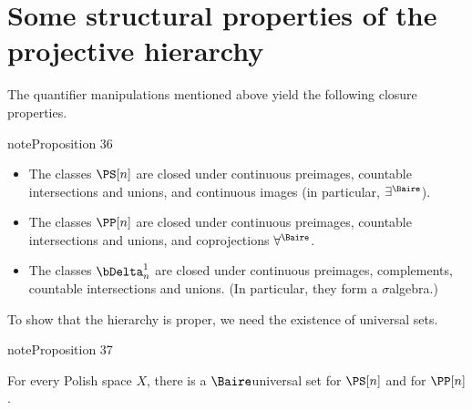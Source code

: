 \documentclass[letterpaper,10pt,english]{jupyterBook}
\begin{document}
\section{Some structural properties of the projective hierarchy}
\label{\detokenize{projective:some-structural-properties-of-the-projective-hierarchy}}
\sphinxAtStartPar
The quantifier manipulations mentioned above yield the following closure properties.
\label{projective:prop-closure-projective}
\begin{sphinxadmonition}{note}{Proposition 36}


\begin{itemize}
\item {} 
\sphinxAtStartPar
{} The classes \(\PS[n]\) are closed under continuous preimages, countable intersections and unions, and continuous images (in particular, \(\exists^{\Baire}\)).

\item {} 
\sphinxAtStartPar
{} The classes \(\PP[n]\) are closed under continuous preimages, countable intersections and unions, and co\sphinxhyphen{}projections \(\forall^{\Baire}\).

\item {} 
\sphinxAtStartPar
{} The classes \(\bDelta^1_n\) are closed under continuous preimages, complements, countable intersections and unions. (In particular, they form a \(\sigma\)\sphinxhyphen{}algebra.)

\end{itemize}
\end{sphinxadmonition}

\sphinxAtStartPar
To show that the hierarchy is proper, we need the existence of universal sets.
\label{projective:prop-universal-projective}
\begin{sphinxadmonition}{note}{Proposition 37}



\sphinxAtStartPar
For every Polish space \(X\), there is a \(\Baire\)\sphinxhyphen{}universal set for \(\PS[n]\) and for \(\PP[n]\).
\end{sphinxadmonition}
\end{document}
